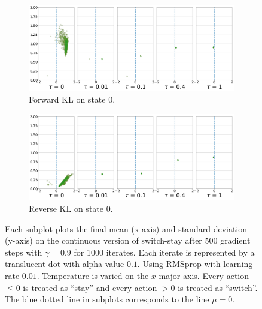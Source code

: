 \documentclass[twoside,11pt]{article}
\begin{document}
\begin{figure}[!htb]
  \centering
  \begin{subfigure}[b]{0.85\linewidth}
    \centering
    \includegraphics[width=\columnwidth]{figs/continuous-switch-stay/notlearnQ/state0_pi_forward_optim=rmsprop_lr=0.01.png}
    \caption{Forward KL on state 0.}
    \label{fig:cont-switch-stay-forward-s0}
  \end{subfigure}\hspace{15pt}
  
  \begin{subfigure}[b]{0.85\linewidth}
        \centering
        \includegraphics[width=\columnwidth]{figs/continuous-switch-stay/notlearnQ/state0_pi_reverse_optim=rmsprop_lr=0.01.png}
        \caption{Reverse KL on state 0.}
        \label{fig:cont-switch-stay-reverse-s0}
  \end{subfigure}

  \caption{Each subplot plots the final mean (x-axis) and standard deviation (y-axis) on the continuous version of switch-stay after 500 gradient steps with $\gamma = 0.9$ for 1000 iterates. Each iterate is represented by a translucent dot with alpha value $0.1$. Using RMSprop with learning rate $0.01$. Temperature is varied on the $x$-major-axis. Every action $\leq 0$ is treated as ``stay'' and every action $> 0$ is treated as ``switch''. The blue dotted line in subplots corresponds to the line $\mu = 0$. }
  \label{fig:final-ss-probs-0}
\end{figure}
\end{document}
